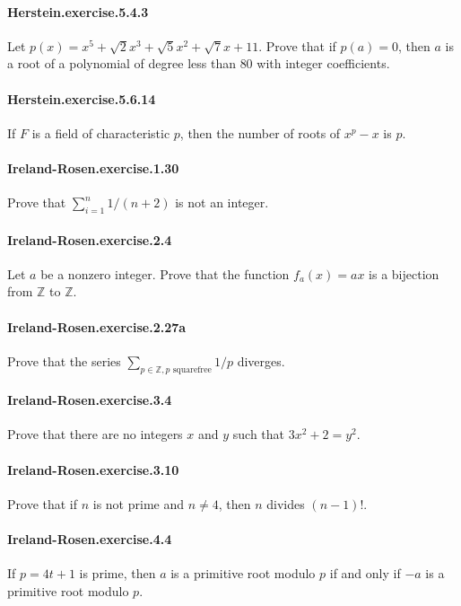\documentclass{article}
\begin{document}
\paragraph{Herstein.exercise.5.4.3} Let $p(x)=x^5+\sqrt{2}x^3+\sqrt{5}x^2+\sqrt{7}x+11$. Prove that if $p(a)=0$, then $a$ is a root of a polynomial of degree less than $80$ with integer coefficients.

\paragraph{Herstein.exercise.5.6.14} If $F$ is a field of characteristic $p$, then the number of roots of $x^p-x$ is $p$.

\paragraph{Ireland-Rosen.exercise.1.30} Prove that $\sum_{i=1}^n 1/(n+2)$ is not an integer.

\paragraph{Ireland-Rosen.exercise.2.4} Let $a$ be a nonzero integer. Prove that the function $f_a(x) = ax$ is a bijection from $\mathbb{Z}$ to $\mathbb{Z}$.

\paragraph{Ireland-Rosen.exercise.2.27a} Prove that the series $\sum_{p\in\mathbb{Z}, p\text{ squarefree}} 1/p$ diverges.

\paragraph{Ireland-Rosen.exercise.3.4} Prove that there are no integers $x$ and $y$ such that $3x^2+2=y^2$.

\paragraph{Ireland-Rosen.exercise.3.10} Prove that if $n$ is not prime and $n\neq 4$, then $n$ divides $(n-1)!$.

\paragraph{Ireland-Rosen.exercise.4.4} If $p=4t+1$ is prime, then $a$ is a primitive root modulo $p$ if and only if $-a$ is a primitive root modulo $p$.
\end{document}
